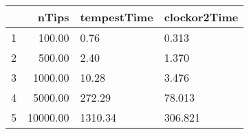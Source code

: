 \begin{table}[ht]
\centering
\begin{tabular}{rrll}
  \hline
 & nTips & tempestTime & clockor2Time \\ 
  \hline
1 & 100.00 & 0.76 & 0.313 \\ 
  2 & 500.00 & 2.40 & 1.370 \\ 
  3 & 1000.00 & 10.28 & 3.476 \\ 
  4 & 5000.00 & 272.29 & 78.013 \\ 
  5 & 10000.00 & 1310.34 & 306.821 \\ 
   \hline
\end{tabular}
\end{table}

